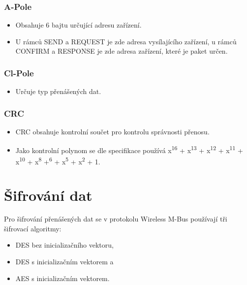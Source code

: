 \subsubsection{A-Pole}
\begin{itemize}
	\item Obsahuje 6 bajtu určující adresu zařízení.
	\item U rámců SEND a REQUEST je zde adresa vysílajícího zařízení, u rámců CONFIRM a RESPONSE je zde adresa zařízení, které je paket určen.
\end{itemize}

\subsubsection{Cl-Pole}
\begin{itemize}
	\item Určuje typ přenášených dat.
\end{itemize}



\subsubsection{CRC}
\begin{itemize}
	\item CRC obsahuje kontrolní součet pro kontrolu správnosti přenosu. 
	\item Jako kontrolní polynom se dle specifikace používá x\textsuperscript{16} + x\textsuperscript{13} + x\textsuperscript{12} + x\textsuperscript{11} + x\textsuperscript{10} + x\textsuperscript{8} +\textsuperscript{6} + x\textsuperscript{5} + x\textsuperscript{2} + 1.
\end{itemize}



\section{Šifrování dat}

Pro šifrování přenášených dat se v protokolu Wireless M-Bus používají tři šifrovací algoritmy:
\begin{itemize}
	\item DES bez inicializačního vektoru,
	\item DES s inicializačním vektorem a
	\item AES s inicializačním vektorem.
\end{itemize}

